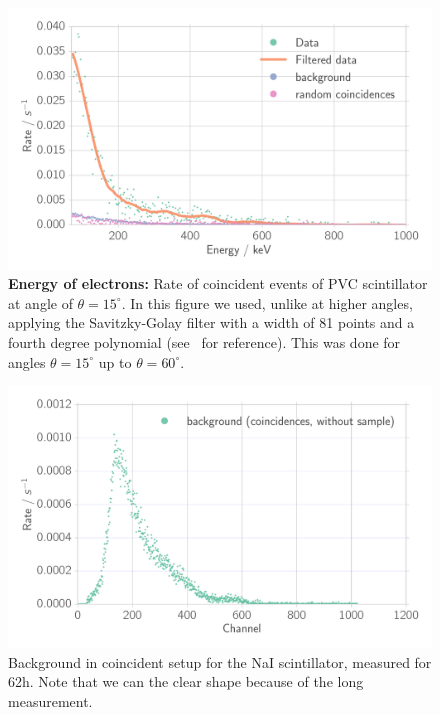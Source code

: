 \begin{figure}[htpb]
    \centering
    \includegraphics[width=0.9\linewidth]{./analysis/figures/coin_ps_15_filter_}
    \caption{\textbf{Energy of electrons:}
        Rate of coincident events of 
        PVC scintillator at angle of $\theta = 15^\circ$.
        In this figure we used, unlike at higher angles, applying the Savitzky-Golay filter
        with a width of 81 points and a fourth
        degree polynomial (see~\cite{scipy} for reference). This was done for 
        angles $\theta = 15^\circ$ up to $\theta = 60^\circ$.}
\label{fig:coin_ps_15}
\end{figure}

\begin{figure}[htpb]
    \centering
    \includegraphics[width=0.9\linewidth]{./analysis/figures/coin_na_background}
    \caption{Background in coincident setup for the NaI scintillator, measured for 62h. Note that we can the clear shape because of the long measurement. } \label{fig:coin_na_background}
\end{figure}

